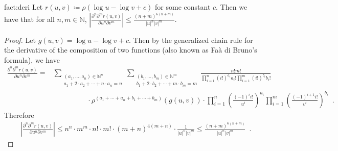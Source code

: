 \documentclass[12pt]{article}
\newcommand{\N}{\mathbb{N}}  \newcommand{\R}{\mathbb{R}} \newcommand{\C}{\mathbb{C}} \newcommand{\U}{\mathbb{U}} \renewcommand{\d}{\mathrm{d}} \DeclareMathOperator*{\E}{\mathbb{E}}  \newcommand{\so}{\mathrm{SO}} \newcommand{\s}{\mathrm{S}} \newcommand{\su}{\mathrm{SU}} \renewcommand{\i}{\mathrm{i}} \newcommand{\A}{\mathcal{A}}  \newcommand{\B}{\mathcal{B}} \newcommand{\CC}{\mathcal{C}} \newcommand{\D}{\mathcal{D}} \newcommand{\F}{\mathcal{F}} \renewcommand{\H}{\mathcal{H}} \newcommand{\K}{\mathcal{K}} \newcommand{\NN}{\mathcal{N}} \newcommand{\V}{\mathcal{V}} \newcommand{\X}{\mathcal{X}} \newcommand{\Y}{\mathcal{Y}} \renewcommand{\S}{\mathcal{S}} \newcommand{\SR}{\mathcal{S}_{\R}} \newcommand{\SC}{\mathcal{S}_{\C}} \newcommand{\EE}{\mathcal{E}}  \newcommand{\PP}{\mathcal{P}} \newcommand{\KK}{\widetilde{K}} \newcommand{\LL}{\widetilde{L}} \newcommand{\W}{\widehat{W}} \newcommand{\f}{\hat{f}} \newcommand{\g}{\hat{g}} \newcommand{\h}{\hat{h}} \newcommand{\bit}[1]{\{0,1\}^{#1}} \newcommand{\wrt}{w.r.t.~} \newcommand{\us}{\overset{\$}{\leftarrow}} \newcommand{\set}[1]{\left\{#1\right\}} \newcommand{\lhs}{\mathrm{LHS}} \newcommand{\expec}[1]{\E\!\Br{#1}} \newcommand{\expect}[2]{\E_{\substack{#1}}\!\Br{#2}} \newcommand{\prob}[2]{\underset{#1}{\mathrm{Pr}}\!\Br{#2}} \newcommand{\cf}{\widetilde{f}} \newcommand{\cg}{\widetilde{g}} \newcommand{\ch}{\widetilde{h}} \newcommand{\ck}{\widetilde{K}} \newcommand{\rep}[2]{\br{#1}_{#2}} \newcommand{\AND}[1]{\mathrm{AND}\!\br{#1}}
\newcommand{\br}[1]{\left(#1\right)} \newcommand{\Br}[1]{\left[#1\right]} \newcommand{\st}[1]{\left\{#1\right\}} \newcommand{\tr}[1]{\mathrm{Tr}\!\Br{#1}} \newcommand{\abs}[1]{\left|#1 \right|} \newcommand{\norm}[1]{\left\lVert #1 \right\rVert} \newcommand{\agl}[2]{\theta^{\br{#1}}_{#2}} \newcommand{\aglp}[2]{{\theta'}^{\br{#1}}_{#2}} \newcommand{\lint}[1]{\left\lfloor#1\right\rfloor} \newcommand{\poly}[1]{\mathrm{poly}\!\br{#1}} \newcommand{\negl}[1]{\mathrm{negl}\!\br{#1}} \newcommand{\de}[1]{\mathrm{d}#1} \newcommand{\val}[1]{\mathrm{val}\!\br{#1}} \newcommand{\vall}[1]{\mathrm{val}\br{#1}} \newcommand{\nd}[1]{\mathcal{N}\!\br{#1}} \newcommand{\ketbratwo}[2]{\ket{#1} \hspace{-0.4em}\bra{#2}} \newcommand{\ketbra}[1]{\ketbratwo{#1}{#1}} \newcommand{\id}{\ensuremath{\mathds{1}}} \newcommand{\ogroup}[1]{\mathrm{O}\!\br{#1}} \newcommand{\ugroup}[1]{\mathrm{U}\!\br{#1}} \newcommand{\td}{\mathrm{TD}} \newcommand{\tv}[1]{\norm{#1}_{\mathrm{TV}}} \newcommand {\defeq} {\ensuremath{ \stackrel{\mathrm{def}}{=} }} \newcommand{\vdim}{\ensuremath{N}} \newcommand{\dimin}{\ensuremath{n}} \newcommand{\dimout}{\ensuremath{m}} \newcommand{\ncopy}{\ell} \newcommand{\hspacein}{\H_\mathrm{in}} \newcommand{\hspaceout}{\H_\mathrm{out}} \newcommand{\Sin}{\S(\hspacein)} \newcommand{\Sout}{\S(\hspaceout)} \newcommand{\haar}{\ensuremath{\mu}} \newcommand{\tensorhaar}{\ensuremath{\eta}} \newcommand{\tensorsrss}{\ensuremath{\nu}} \newcommand{\qadvice}{\ensuremath{\rho}} \newcommand{\tp}{\otimes} \newcommand{\wone}[2]{W_1\!\br{#1,#2}}
\begin{document}
\begin{appendices}
\begin{repfact}{fact:deri}
	Let $r(u,v) \coloneq \rho( \log u-\log v + c )$ for some constant $c$. Then we have that for all $n,m\in \N$,
	$ \abs{ \frac{ \partial^n \partial^m r(u,v) }{ \partial u^n \partial v^m } } \leq \frac{(n+m)^{6(n+m)}}{\abs{u}^n \abs{v}^m} $.
\end{repfact}

\begin{proof}
	Let $g(u,v) = \log u-\log v + c$. Then by the generalized chain rule for the derivative of the composition of two functions (also known as Fa\`a di Bruno's formula), we have
	\begin{align*}
		\frac{ \partial^n \partial^m r(u,v) }{ \partial u^n \partial v^m }
		= &\sum_{\substack{(a_1,\dots,a_n)\in\N^n\\ a_1+2\cdot a_2+\cdots +n\cdot a_n=n }}
		\sum_{\substack{(b_1,\dots,b_m)\in\N^m\\ b_1+2\cdot b_2+\cdots +m\cdot b_m=m}} \frac{n!m!}{\prod_{i=1}^n \br{i!}^{a_i}a_i! \prod_{i=1}^m \br{i!}^{b_i}b_i!}
		\\ &\hspace{2cm}\cdot \rho^{(a_1+\cdots+a_n+b_1+\cdots+b_m)}(g(u,v))
		\cdot\prod_{i=1}^n \br{\frac{(-1)^ii!}{u^i}}^{a_i}
		\prod_{i=1}^m \br{\frac{(-1)^{i+1}i!}{v^i}}^{b_i}\enspace.
	\end{align*}
	Therefore
	\begin{align*}
		&\abs{ \frac{ \partial^n \partial^m r(u,v) }{ \partial u^n \partial v^m } } \leq n^n\cdot m^m\cdot n!\cdot m!\cdot (m+n)^{4(m+n)}\cdot \frac{1}{\abs{u}^n\abs{v}^m} \leq \frac{(n+m)^{6(n+m)}}{\abs{u}^n \abs{v}^m}\enspace.
	\end{align*}
\end{proof}


%
 
\end{appendices}
\end{document}
